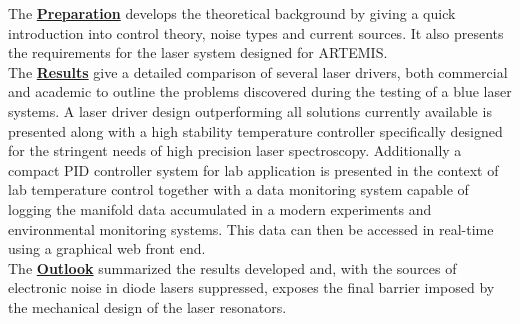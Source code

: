 The \hyperref[sec:preparation]{\textbf{Preparation}} develops the theoretical background by giving a quick introduction into control theory, noise types and current sources. It also presents the requirements for the laser system designed for ARTEMIS.\\

The \hyperref[sec:results]{\textbf{Results}} give a detailed comparison of several laser drivers, both commercial and academic to outline the problems discovered during the testing of a blue laser systems. A laser driver design outperforming all solutions currently available is presented along with a high stability temperature controller specifically designed for the stringent needs of high precision laser spectroscopy. Additionally a compact PID controller system for lab application is presented in the context of lab temperature control together with a data monitoring system capable of logging the manifold data accumulated in a modern experiments and environmental monitoring systems. This data can then be accessed in real-time using a graphical web front end.\\

The \hyperref[sec:outlook]{\textbf{Outlook}} summarized the results developed and, with the sources of electronic noise in diode lasers suppressed, exposes the final barrier imposed by the mechanical design of the laser resonators.

